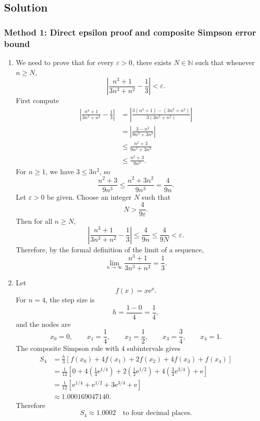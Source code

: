 \documentclass[12pt]{article}
\newcommand{\ee}{\mathrm{e}}
\newcommand{\N}{\mathbb{N}}
\newcommand{\abs}[1]{\left|#1\right|}
\begin{document}
\subsection{Solution}

\subsubsection{Method 1: Direct epsilon proof and composite Simpson error bound}

\begin{enumerate}[label=(\alph*)]
\item We need to prove that for every $\varepsilon>0$, there exists $N\in\N$ such that whenever $n\geq N$,
\[
\abs{\frac{n^3+1}{3n^3+n^2}-\frac13}<\varepsilon.
\]
First compute
\begin{align*}
\abs{\frac{n^3+1}{3n^3+n^2}-\frac13}
&=\abs{\frac{3(n^3+1)-(3n^3+n^2)}{3(3n^3+n^2)}} \\
&=\abs{\frac{3-n^2}{9n^3+3n^2}} \\
&\leq \frac{n^2+3}{9n^3+3n^2} \\
&\leq \frac{n^2+3}{9n^3}.
\end{align*}
For $n\geq 1$, we have $3\leq 3n^2$, so
\[
\frac{n^2+3}{9n^3}\leq \frac{n^2+3n^2}{9n^3}=\frac{4}{9n}.
\]
Let $\varepsilon>0$ be given. Choose an integer $N$ such that
\[
N>\frac{4}{9\varepsilon}.
\]
Then for all $n\geq N$,
\[
\abs{\frac{n^3+1}{3n^3+n^2}-\frac13}
\leq \frac{4}{9n}
\leq \frac{4}{9N}
<\varepsilon.
\]
Therefore, by the formal definition of the limit of a sequence,
\[
\boxed{\displaystyle \lim_{n\to\infty}\frac{n^3+1}{3n^3+n^2}=\frac13.}
\]

\item Let
\[
f(x)=x\ee^x.
\]
For $n=4$, the step size is
\[
h=\frac{1-0}{4}=\frac14,
\]
and the nodes are
\[
x_0=0,\qquad x_1=\frac14,\qquad x_2=\frac12,\qquad x_3=\frac34,\qquad x_4=1.
\]
The composite Simpson rule with $4$ subintervals gives
\begin{align*}
S_4
&=\frac{h}{3}\left[f(x_0)+4f(x_1)+2f(x_2)+4f(x_3)+f(x_4)\right] \\
&=\frac{1}{12}\left[0+4\left(\frac14\ee^{1/4}\right)+2\left(\frac12\ee^{1/2}\right)+4\left(\frac34\ee^{3/4}\right)+\ee\right] \\
&=\frac{1}{12}\left[\ee^{1/4}+\ee^{1/2}+3\ee^{3/4}+\ee\right] \\
&\approx 1.000169047140.
\end{align*}
Therefore
\[
\boxed{S_4\approx 1.0002\quad\text{to four decimal places}.}
\]


\end{enumerate}
\end{document}
